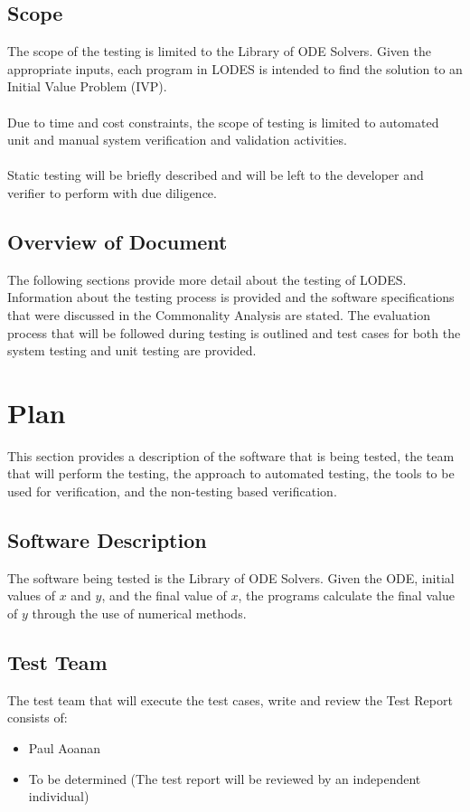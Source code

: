 \documentclass[12pt, titlepage]{article}
\newcommand{\famname}{LODES} %
\newcommand{\famdesc}{Library of ODE Solvers}
\begin{document}
\subsection{Scope}
The scope of the testing is limited to the \famdesc{}. Given the appropriate inputs, each program in \famname{} is 
intended to find
the solution to an Initial Value Problem (IVP).\\
\\
Due to time and cost constraints, the scope of testing is limited to automated unit and manual system verification 
and validation activities.\\
\\
Static testing will be briefly described and will be left to the developer and verifier to perform with due diligence.

\subsection{Overview of Document}
The following sections provide more detail about the testing of \famname{}.
Information about the testing process is provided and the software specifications
that were discussed in the Commonality Analysis are stated.
The evaluation process that will be followed during testing is outlined and test cases
for both the system testing and unit testing are provided.

\section{Plan}
This section provides a description of the software that is being tested, the team that will
perform the testing, the approach to automated testing, the tools to be used for verification,
and the non-testing based verification. 
	
\subsection{Software Description}
The software being tested is the \famdesc{}. Given the ODE, initial values of $x$ and $y$, and the final value of 
$x$,
the programs calculate the final value of $y$ through the use of numerical methods.

\subsection{Test Team}

The test team that will execute the test cases, write and review the Test Report consists of:
\begin{itemize}
 \item Paul Aoanan
 \item To be determined (The test report will be reviewed by an independent individual)
\end{itemize} 
\end{document}
